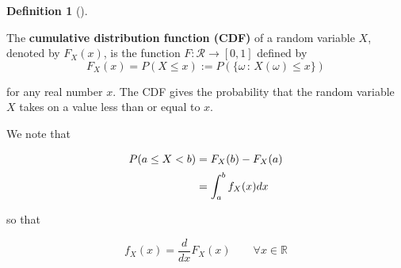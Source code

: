 \documentclass[
  letterpaper,
  DIV=11,
  numbers=noendperiod]{scrreport}
\theoremstyle{definition}
\theoremstyle{plain}
\theoremstyle{definition}
\newtheorem{definition}{Definition}[chapter]
\theoremstyle{plain}
\theoremstyle{remark}
\begin{document}
\begin{tcolorbox}[enhanced jigsaw, breakable, opacityback=0, leftrule=.75mm, colback=white, bottomtitle=1mm, coltitle=black, toptitle=1mm, titlerule=0mm, bottomrule=.15mm, colframe=quarto-callout-note-color-frame, title={Cumulative Distribution Function (CDF)}, opacitybacktitle=0.6, colbacktitle=quarto-callout-note-color!10!white, rightrule=.15mm, arc=.35mm, toprule=.15mm, left=2mm]

\begin{definition}[]\protect\hypertarget{def-cdf}{}\label{def-cdf}

The \textbf{cumulative distribution function (CDF)} of a random variable
\(X\), denoted by \(F_X(x)\), is the function
\(F: \mathcal R \to [0,1]\) defined by \[
F_X(x) = P(X \le x):=P(\{\omega\,:\,X(\omega)\leq x\})
\]

for any real number \(x\). The CDF gives the probability that the random
variable \(X\) takes on a value less than or equal to \(x\).

\end{definition}

\end{tcolorbox}

We note that

\[
\begin{aligned}
P(a \leq X <b ) &= F_X(b) - F_X(a)\\
\rule{0in}{4ex}    &= \int_a^b f_X(x) dx  
\end{aligned}
\]

so that

\[
f_X(x) = \frac{d}{dx} F_X(x)\qquad \forall x \in \mathbb R
\]
\end{document}
